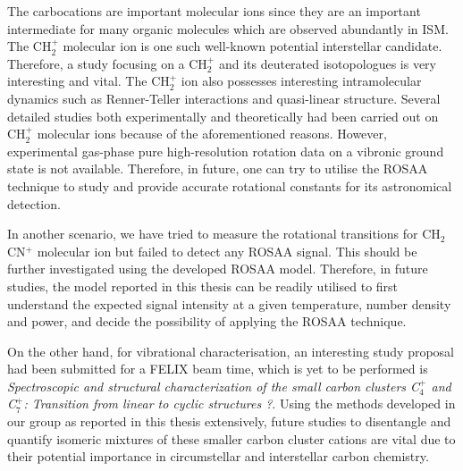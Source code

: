 The carbocations are important molecular ions since they are an important intermediate for many organic molecules which are observed abundantly in ISM. The CH$_2^+$ molecular ion is one such  well-known potential interstellar candidate. Therefore, a study focusing on a CH$_2^+$  and its deuterated isotopologues is very interesting and vital. The CH$_2^+$ ion also possesses interesting intramolecular dynamics such as Renner-Teller interactions and quasi-linear structure. Several detailed studies both experimentally and theoretically had been carried out on CH$_2^+$ molecular ions because of the aforementioned reasons. However, experimental gas-phase pure high-resolution rotation data on a vibronic ground state is not available. Therefore, in future, one can try to utilise the ROSAA technique to study and provide accurate rotational constants for its astronomical detection.

In another scenario, we have tried to measure the rotational transitions for CH$_2$CN$^+$ molecular ion but failed to detect any ROSAA signal. This should be further investigated using the developed ROSAA model. Therefore, in future studies, the model reported in this thesis can be readily utilised to first understand the expected signal intensity at a given temperature, number density and power, and decide the possibility of applying the ROSAA technique.

On the other hand, for vibrational characterisation, an interesting study proposal had been submitted for a FELIX beam time, which is yet to be performed is \emph{Spectroscopic and structural characterization of the small carbon clusters C$_4^+$ and C$_7^+$: Transition from linear to cyclic structures ?}. Using the methods developed in our group as reported in this thesis extensively, future studies to disentangle and quantify isomeric mixtures of these smaller carbon cluster cations are vital due to their potential importance in circumstellar and interstellar carbon chemistry.
